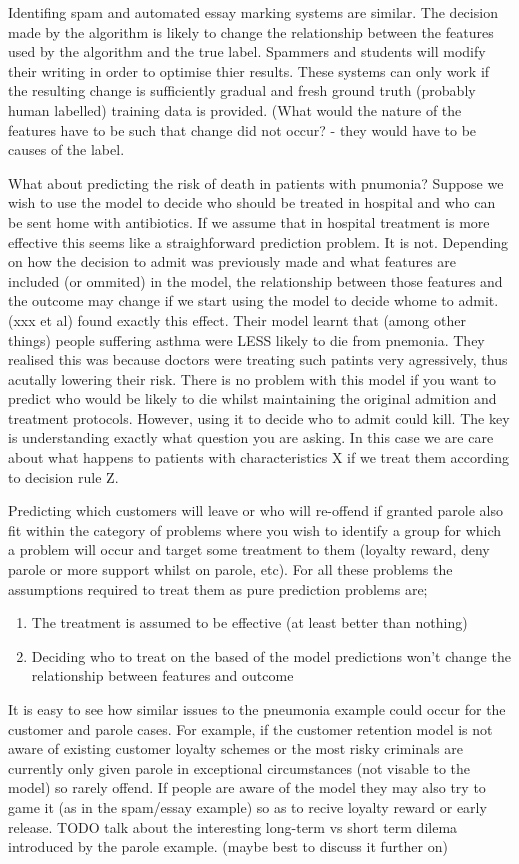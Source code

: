 \documentclass[11pt,a4paper]{article}
\begin{document}
Identifing spam and automated essay marking systems are similar. The decision made by the algorithm is likely to change the relationship between the features used by the algorithm and the true label. Spammers and students will modify their writing in order to optimise thier results. These systems can only work if the resulting change is sufficiently gradual and fresh ground truth (probably human labelled) training data is provided. (What would the nature of the features have to be such that change did not occur? - they would have to be causes of the label. 

What about predicting the risk of death in patients with pnumonia? Suppose we wish to use the model to decide who should be treated in hospital and who can be sent home with antibiotics. If we assume that in hospital treatment is more effective this seems like a straighforward prediction problem. It is not. Depending on how the decision to admit was previously made and what features are included (or ommited) in the model, the relationship between those features and the outcome may change if we start using the model to decide whome to admit. (xxx et al) found exactly this effect. Their model learnt that (among other things) people suffering asthma were LESS likely to die from pnemonia. They realised this was because doctors were treating such patints very agressively, thus acutally lowering their risk. There is no problem with this model if you want to predict who would be likely to die whilst maintaining the original admition and treatment protocols. However, using it to decide who to admit could kill. The key is understanding exactly what question you are asking. In this case we are care about what happens to patients with characteristics X if we treat them according to decision rule Z.   


Predicting which customers will leave or who will re-offend if granted parole also fit within the category of problems where you wish to identify a group for which a problem will occur and target some treatment to them (loyalty reward, deny parole or more support whilst on parole, etc). For all these problems the assumptions required to treat them as pure prediction problems are;
\begin{enumerate}
\item The treatment is assumed to be effective (at least better than nothing)
\item Deciding who to treat on the based of the model predictions won't change the relationship between features and outcome 
\end{enumerate}
It is easy to see how similar issues to the pneumonia example could occur for the customer and parole cases. For example, if the customer retention model is not aware of existing customer loyalty schemes or the most risky criminals are currently only given parole in exceptional circumstances (not visable to the model) so rarely offend. If people are aware of the model they may also try to game it (as in the spam/essay example) so as to recive loyalty reward or early release. TODO talk about the interesting long-term vs short term dilema introduced by the parole example. (maybe best to discuss it further on)
\end{document}
